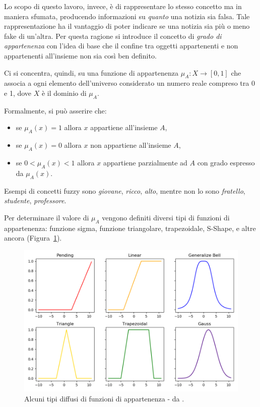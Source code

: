 \documentclass[12pt]{report}
\theoremstyle{definition}
\begin{document}
Lo scopo di questo lavoro, invece, è di rappresentare lo stesso concetto ma in maniera sfumata, producendo informazioni su \textit{quanto} una notizia sia falsa.
Tale rappresentazione ha il vantaggio di poter indicare se una notizia sia più o meno fake di un'altra.
Per questa ragione si introduce il concetto di \textit{grado di appartenenza} con l'idea di base che il confine tra oggetti appartenenti e non appartenenti all'insieme non sia così ben definito.

Ci si concentra, quindi, su una funzione di appartenenza $\mu_A: X \rightarrow [0,1]$ che associa a ogni elemento dell'universo considerato un numero reale compreso tra 0 e 1, dove $X$ è il dominio di $\mu_A$.

Formalmente, si può asserire che:
\begin{itemize}
    \item se $\mu_A(x) = 1$ allora $x$ appartiene all'insieme $A$,
    \item se $\mu_A(x) = 0$ allora $x$ non appartiene all'insieme $A$,
    \item se $0 < \mu_A(x) < 1$ allora $x$ appartiene parzialmente ad $A$ con grado espresso da $\mu_A(x)$.
\end{itemize}
Esempi di concetti fuzzy sono \textit{giovane}, \textit{ricco}, \textit{alto}, mentre non lo sono \textit{fratello}, \textit{studente}, \textit{professore}.

Per determinare il valore di $\mu_A$ vengono definiti diversi tipi di funzioni di appartenenza: funzione sigma, funzione triangolare, trapezoidale, S-Shape, e altre ancora (Figura~\ref{membership_functions}). 
\begin{figure}
    \centering
    \includegraphics[scale = 0.7]{images/membership_functions.png}
    \caption{Alcuni tipi diffusi di funzioni di appartenenza - da \cite{30}.}
    \label{membership_functions}
\end{figure}
\end{document}
